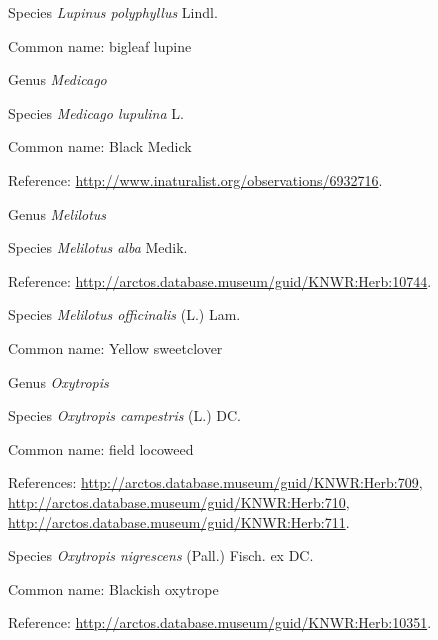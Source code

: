 \documentclass[9pt, article]{memoir}
\begin{document}
\begin{multicols}{2}
\vspace{6pt}\noindent\hspace{36pt}Species \textit{Lupinus polyphyllus} Lindl.


Common name: bigleaf lupine

\vspace{6pt}\noindent\hspace{30pt}Genus \textit{Medicago}


\vspace{6pt}\noindent\hspace{36pt}Species \textit{Medicago lupulina} L.


Common name: Black Medick

Reference: 
\url{http://www.inaturalist.org/observations/6932716}.

\vspace{6pt}\noindent\hspace{30pt}Genus \textit{Melilotus}


\vspace{6pt}\noindent\hspace{36pt}Species \textit{Melilotus alba} Medik.


Reference: 
\url{http://arctos.database.museum/guid/KNWR:Herb:10744}.

\vspace{6pt}\noindent\hspace{36pt}Species \textit{Melilotus officinalis} (L.) Lam.


Common name: Yellow sweetclover

\vspace{6pt}\noindent\hspace{30pt}Genus \textit{Oxytropis}


\vspace{6pt}\noindent\hspace{36pt}Species \textit{Oxytropis campestris} (L.) DC.


Common name: field locoweed

References: 
\url{http://arctos.database.museum/guid/KNWR:Herb:709}, 
\url{http://arctos.database.museum/guid/KNWR:Herb:710}, 
\url{http://arctos.database.museum/guid/KNWR:Herb:711}.

\vspace{6pt}\noindent\hspace{36pt}Species \textit{Oxytropis nigrescens} (Pall.) Fisch. ex DC.


Common name: Blackish oxytrope

Reference: 
\url{http://arctos.database.museum/guid/KNWR:Herb:10351}.


\end{multicols}
\end{document}
